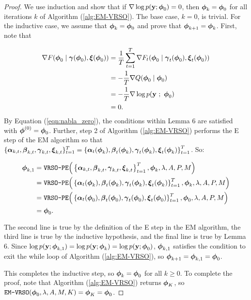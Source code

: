 \begin{proof}

We use induction and show that if $\nabla \log p(\mathbf{y};\boldsymbol{\phi}_0) = 0$, then $\boldsymbol{\phi}_{k} = \boldsymbol{\phi}_0$ for all iterations $k$ of Algorithm (\ref{alg:EM-VRSO}). The base case, $k = 0$, is trivial. For the inductive case, we assume that $\boldsymbol{\phi}_k = \boldsymbol{\phi}_0$ and prove that $\boldsymbol{\phi}_{k+1} = \boldsymbol{\phi}_k$. First, note that 

\begin{align}
    \nabla F(\boldsymbol{\phi}_{0} \mid \boldsymbol{\gamma}(\boldsymbol{\phi}_{0}), \boldsymbol{\xi}(\boldsymbol{\phi}_{0})) &= \frac{1}{T} \sum_{t=1}^T \nabla F_t(\boldsymbol{\phi}_0 \mid \boldsymbol{\gamma}_t(\boldsymbol{\phi}_0), \boldsymbol{\xi}_t(\boldsymbol{\phi}_0)) \nonumber \\
    &= -\frac{1}{T} \nabla Q(\boldsymbol{\phi}_0 \mid \boldsymbol{\phi}_0) \nonumber \\
    &= -\frac{1}{T} \nabla \log p(\mathbf{y} ~;~ \boldsymbol{\phi}_0) \nonumber \\
    &= 0 \label{eqn:nabla_zero}.
\end{align}
%
By Equation (\ref{eqn:nabla_zero}), the conditions within Lemma 6 are satisfied with $\boldsymbol{\phi}^{(0)} = \boldsymbol{\phi}_0$. Further, step 2 of Algorithm (\ref{alg:EM-VRSO}) performs the E step of the EM algorithm so that $\{\boldsymbol{\alpha}_{k,t}, \boldsymbol{\beta}_{k,t}, \boldsymbol{\gamma}_{k,t}, \boldsymbol{\xi}_{k,t}\}_{t=1}^T = \left\{\boldsymbol{\alpha}_t(\boldsymbol{\phi}_k), \boldsymbol{\beta}_t(\boldsymbol{\phi}_k), \boldsymbol{\gamma}_t(\boldsymbol{\phi}_k), \boldsymbol{\xi}_t(\boldsymbol{\phi}_k) \right\}_{t=1}^T$. So:

\begin{align*}
    \boldsymbol{\phi}_{k,1} &= \texttt{VRSO-PE}\Big(\left\{\boldsymbol{\alpha}_{k,t}, \boldsymbol{\beta}_{k,t}, \boldsymbol{\gamma}_{k,t}, \boldsymbol{\xi}_{k,t}\right\}_{t=1}^T, \boldsymbol{\phi}_k, \lambda, A, P, M \Big) \\
    &= \texttt{VRSO-PE}\Big(\left\{\boldsymbol{\alpha}_t(\boldsymbol{\phi}_k),\boldsymbol{\beta}_t(\boldsymbol{\phi}_k),\boldsymbol{\gamma}_t(\boldsymbol{\phi}_k),\boldsymbol{\xi}_t(\boldsymbol{\phi}_k)\right\}_{t=1}^T, \boldsymbol{\phi}_k, \lambda, A, P, M \Big)\\
    &= \texttt{VRSO-PE}\Big(\left\{\boldsymbol{\alpha}_t(\boldsymbol{\phi}_0),\boldsymbol{\beta}_t(\boldsymbol{\phi}_0),\boldsymbol{\gamma}_t(\boldsymbol{\phi}_0),\boldsymbol{\xi}_t(\boldsymbol{\phi}_0)\right\}_{t=1}^T, \boldsymbol{\phi}_0, \lambda, A, P, M \Big)\\
    &= \boldsymbol{\phi}_0.
\end{align*}

The second line is true by the definition of the E step in the EM algorithm, the third line is true by the inductive hypothesis, and the final line is true by Lemma 6. Since $\log p(\mathbf{y}; \boldsymbol{\phi}_{k,1}) = \log p(\mathbf{y};\boldsymbol{\phi}_{k}) = \log p(\mathbf{y}; \boldsymbol{\phi}_{0})$, $\boldsymbol{\phi}_{k,1}$ satisfies the condition to exit the while loop of Algorithm (\ref{alg:EM-VRSO}), so $\boldsymbol{\phi}_{k+1} = \boldsymbol{\phi}_{k,1} = \boldsymbol{\phi}_{0}$. 

This completes the inductive step, so $\boldsymbol{\phi}_k = \boldsymbol{\phi}_0$ for all $k \geq 0$. To complete the proof, note that Algorithm (\ref{alg:EM-VRSO}) returns $\boldsymbol{\phi}_K$, so $\texttt{EM-VRSO}(\boldsymbol{\phi}_0, \lambda, A, M, K) = \boldsymbol{\phi}_K = \boldsymbol{\phi}_0$.
\end{proof}